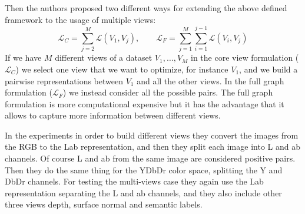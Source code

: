 Then the authors proposed two different ways for extending the above defined framework to the usage of multiple views:
\[ \mathcal{L}_C = \sum_{j=2}^{M} \mathcal{L}(V_1, V_j), \qquad \mathcal{L}_F = \sum_{j=1}^{M} \sum_{i=1}^{j-1} \mathcal{L}(V_i, V_j)\]
If we have $M$ different views of a dataset $V_1, \dots, V_M$ in the core view formulation ($\mathcal{L}_C$) we select one view that we want to optimize, for instance $V_1$, and we build a pairwise representations between $V_1$ and all the other views. In the full graph formulation ($\mathcal{L}_F$) we instead consider all the possible pairs. The full graph formulation is more computational expensive but it has the advantage that it allows to capture more information between different views.

In the experiments in order to build different views they convert the images from the RGB to the Lab representation, and then they split each image into L and ab channels. Of course L and ab from the same image are considered positive pairs. Then they do the same thing for the YDbDr color space, splitting the Y and DbDr channels. For testing the multi-views case they again use the Lab representation separating the L and ab channels, and they also include other three views depth, surface normal and semantic labels.